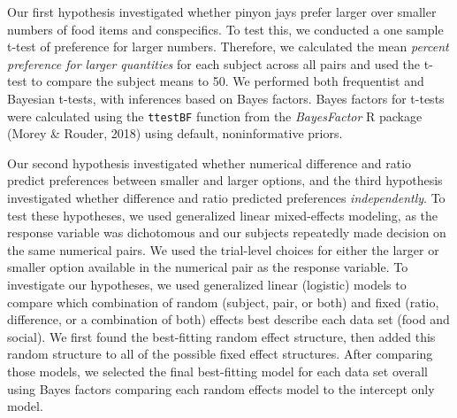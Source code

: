\documentclass[
  ,pub,floatsintext]{apa6}
\begin{document}
Our first hypothesis investigated whether pinyon jays prefer larger over smaller numbers of food items and conspecifics. To test this, we conducted a one sample t-test of preference for larger numbers. Therefore, we calculated the mean \emph{percent preference for larger quantities} for each subject across all pairs and used the t-test to compare the subject means to 50. We performed both frequentist and Bayesian t-tests, with inferences based on Bayes factors. Bayes factors for t-tests were calculated using the \texttt{ttestBF} function from the \emph{BayesFactor} R package (Morey \& Rouder, 2018) using default, noninformative priors.

Our second hypothesis investigated whether numerical difference and ratio predict preferences between smaller and larger options, and the third hypothesis investigated whether difference and ratio predicted preferences \emph{independently}. To test these hypotheses, we used generalized linear mixed-effects modeling, as the response variable was dichotomous and our subjects repeatedly made decision on the same numerical pairs. We used the trial-level choices for either the larger or smaller option available in the numerical pair as the response variable. To investigate our hypotheses, we used generalized linear (logistic) models to compare which combination of random (subject, pair, or both) and fixed (ratio, difference, or a combination of both) effects best describe each data set (food and social). We first found the best-fitting random effect structure, then added this random structure to all of the possible fixed effect structures. After comparing those models, we selected the final best-fitting model for each data set overall using Bayes factors comparing each random effects model to the intercept only model.
\end{document}
